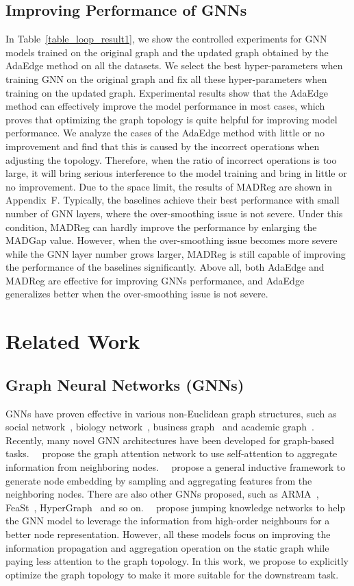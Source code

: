 \documentclass[letterpaper]{article} \usepackage{aaai20}  \usepackage{times}  \usepackage{helvet} \usepackage{courier}  \usepackage[hyphens]{url}  \usepackage{graphicx} \urlstyle{rm} \def\UrlFont{\rm}  \frenchspacing  \setlength{\pdfpagewidth}{8.5in}  \setlength{\pdfpageheight}{11in}  \setcounter{secnumdepth}{0}
\newcommand{\citet}[1]{\citeauthor{#1}~\shortcite{#1}}
\newcommand{\citep}{\cite}
\begin{document}
\subsection{Improving Performance of GNNs}
In Table~\ref{table_loop_result1}, we show the controlled experiments for GNN models trained on the original graph and the updated graph obtained by the AdaEdge method on all the  datasets. We select the best hyper-parameters when training GNN on the original graph and fix all these hyper-parameters when training on the updated graph. Experimental results show that the AdaEdge method can effectively improve the model performance in most cases, which proves that optimizing the graph topology is quite helpful for improving model performance. 
We analyze the cases of the AdaEdge method with little or no improvement and find that this is caused by the incorrect operations when adjusting the topology. 
Therefore, when the ratio of incorrect operations is too large, it will bring serious interference to the model training and bring in little or no improvement.
Due to the space limit, the results of MADReg are shown in Appendix~F. 
Typically, the baselines achieve their best performance with small number of GNN layers, where the over-smoothing issue is not severe. Under this condition, MADReg can hardly improve the performance by enlarging the MADGap value. However, when the over-smoothing issue becomes more severe while the GNN layer number grows larger, MADReg is still capable of improving the performance of the baselines significantly.
Above all, both AdaEdge and MADReg are effective for improving GNNs performance, and AdaEdge generalizes better when the over-smoothing issue is not severe.

\section{Related Work}
\subsection{Graph Neural Networks (GNNs)}
GNNs have proven effective in various non-Euclidean graph structures, such as social network~\citep{model_sage}, biology network~\citep{dataset_ppi}, business graph~\citep{dataset_real_amazon} and academic graph~\citep{dataset_real_ccp}. 
Recently, many novel GNN architectures have been developed for graph-based tasks.~\citet{model_gat} propose the graph attention network to use self-attention to aggregate information from neighboring nodes.~\citet{model_sage} propose a general inductive framework to generate node embedding by sampling and aggregating features from the neighboring nodes. There are also other GNNs proposed, such as ARMA~\citep{model_arma}, FeaSt~\citep{model_feast}, HyperGraph~\citep{model_hyper_graph} and so on.~\citet{jump_knowledge} propose jumping knowledge networks to help the GNN model to leverage the information from high-order neighbours for a better node representation.
However, all these models focus on improving the information propagation and aggregation operation on the static graph while paying less attention to the graph topology. 
In this work, we propose to explicitly optimize the graph topology to make it more suitable for the downstream task.
\end{document}

